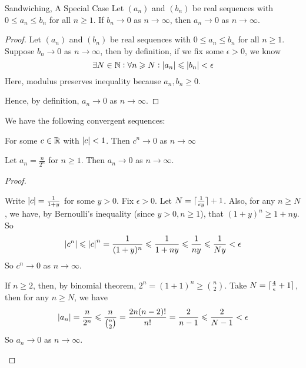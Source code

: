 \documentclass{styles/tufte}
\begin{document}
    \begin{proposition}{Sandwiching, A Special Case}{}
      Let $(a_n)$ and $(b_n)$ be real sequences with $0 \leqslant a_n \leqslant b_n$ for all $n \geqslant 1$. If $b_n \to 0$ as $n \to \infty$, then $a_n \to 0$ as $n \to \infty$.
    \end{proposition}
    \begin{proof}
      Let $(a_n)$ and $(b_n)$ be real sequences with $0 \leqslant a_n \leqslant b_n$ for all $n \geqslant 1$. Suppose $b_n \to 0$ as $n \to \infty$, then by definition, if we fix some $\epsilon > 0$, we know
      \[ \exists N \in \NN : \forall n \geqslant N : \abs{a_n} \leqslant \abs{b_n} < \epsilon \]
      Here, modulus preserves inequality because $a_n, b_n \geqslant 0$.
      
      Hence, by definition, $a_n \to 0$ as $n \to \infty$.
    \end{proof}
    
    \begin{lemma}{}{}
      We have the following convergent sequences:
      \begin{romanenum}
        \item For some $c \in \mathbb{R}$ with $\abs{c} < 1$. Then $c^n \to 0$ as $n \to \infty$
        \item Let $a_n = \frac{n}{2^n}$ for $n \geqslant 1$. Then $a_n \to 0$ as $n \to \infty$.
      \end{romanenum}
    \end{lemma}
    \begin{proof}\
      \begin{romanenum}
        \item Write $\abs{c} = \frac{1}{1+y}$ for some $y > 0$. Fix $\epsilon > 0$. Let $N = \ceil{\frac{1}{\epsilon y}} + 1$. Also, for any $n \geqslant N$, we have, by Bernoulli's inequality (since $y > 0, n \geqslant 1$), that $(1 + y)^n \geqslant 1 + ny$. So
          \[ \abs{c^n} \leqslant \abs{c}^n = \frac{1}{(1 + y)^n} \leqslant \frac{1}{1 + ny} \leqslant \frac{1}{ny} \leqslant \frac{1}{Ny} < \epsilon \]
          So $c^n \to 0$ as $n \to \infty$.
        \item If $n \geqslant 2$, then, by binomial theorem, $2^n = (1 + 1)^n \geqslant {n \choose 2}$. Take $N = \ceil{\frac{4}{\epsilon} + 1}$, then for any $n \geqslant N$, we have
          \[ \abs{a_n} = \frac{n}{2^n} \leqslant \frac{n}{{n \choose 2}} = \frac{2n (n - 2)!}{n!} = \frac{2}{n - 1} \leqslant \frac{2}{N - 1} < \epsilon \]
          So $a_n \to 0$ as $n \to \infty$. \qedhere
      \end{romanenum}
    \end{proof}
    
\end{document}
